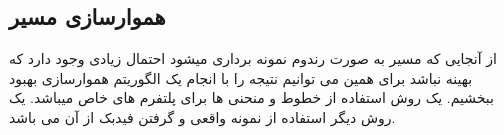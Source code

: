 \subsection{هموارسازی مسیر}
از آنجایی که مسیر به صورت رندوم نمونه برداری میشود احتمال زیادی وجود دارد که بهینه نباشد برای همین می توانیم نتیجه را با انجام یک الگوریتم هموارسازی بهبود ببخشیم.
یک روش استفاده از خطوط و منحنی ها برای پلتفرم های خاص میباشد.
یک روش دیگر استفاده از نمونه واقعی و گرفتن فیدبک از آن می باشد. 
